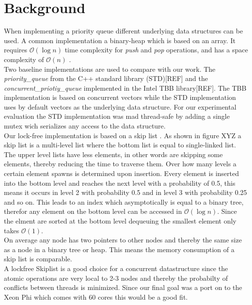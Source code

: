 \section{Background}
\label{sec:background}

When implementing a priority queue different underlying data structures can be used.
A common implementation a binary-heap which is based on an array. It requires $\mathcal{O}(\log{}n)$ time complexity for \textit{push} and \textit{pop} operations, and has a space complexity of $\mathcal{O}(n)$ .\\
Two baseline implementations are used to compare with our work. The \textit{priority\_queue} from the C++ standard library (STD)[REF] and the \textit{concurrent\_priotiy\_queue} implemented in the Intel TBB library[REF].
The TBB implementation is based on concurrent vectors while the STD implementation uses by default vectors as the underlying data structure. For our experimental evaluation the STD implementation was mad thread-safe by adding a single mutex wich serializes any access to the data structure.\\
Our lock-free implementation is based on a skip list \cite{Pugh:1990:SLP:78973.78977}. As shown in figure XYZ a skip list is a multi-level list where the bottom list is equal to single-linked list. The upper level lists have less elements, in other words are skipping some elements, thereby reducing the time to traverse them. Over how many levels a certain element spawns is determined upon insertion. Every element is inserted into the bottom level and reaches the next level with a probability of 0.5, this means it occurs in level 2 with probability 0.5 and in level 3 with probability 0.25 and so on. This leads to an index which asymptotically is equal to a binary tree, therefor any element on the bottom level can be accessed in $\mathcal{O}(\log{}n)$. Since the elment are sorted at the bottom level dequeuing the smallest element only takes $\mathcal{O}(1)$.\\
On average any node has two pointers to other nodes and thereby the same size as a node in a binary tree or heap. This means the memory consumption of a skip list is comparable.\\
A lockfree Skiplist is a good choice for a concurrent datastructure since the atomic operations are very local to 2-3 nodes and thereby the probabilty of conflicts between threads is minimized. Since our final goal was a port on to the Xeon Phi which comes with 60 cores this would be a good fit.\\
